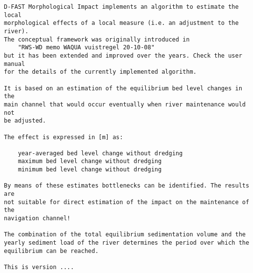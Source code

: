\begin{Verbatim}[frame=single, framesep=5pt]
D-FAST Morphological Impact implements an algorithm to estimate the local
morphological effects of a local measure (i.e. an adjustment to the river).
The conceptual framework was originally introduced in
    "RWS-WD memo WAQUA vuistregel 20-10-08"
but it has been extended and improved over the years. Check the user manual
for the details of the currently implemented algorithm.

It is based on an estimation of the equilibrium bed level changes in the
main channel that would occur eventually when river maintenance would not
be adjusted.

The effect is expressed in [m] as:

    year-averaged bed level change without dredging
    maximum bed level change without dredging
    minimum bed level change without dredging

By means of these estimates bottlenecks can be identified. The results are
not suitable for direct estimation of the impact on the maintenance of the
navigation channel!

The combination of the total equilibrium sedimentation volume and the
yearly sediment load of the river determines the period over which the
equilibrium can be reached.

This is version ....
\end{Verbatim}

